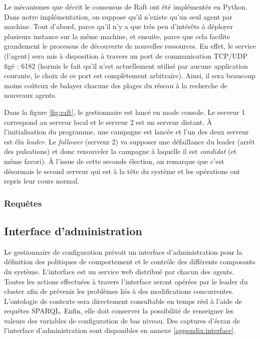 Le mécanismes que décrit le consensus de Raft ont été implémentés en Python.
Dans notre implémentation, on suppose qu'il n'existe qu'un seul agent par
machine. Tout d'abord, parce qu'il n'y a que très peu d'intérêts à déployer
plusieurs instance sur la même machine, et ensuite, parce que cela facilite
grandement le processus de découverte de nouvelles ressources. En effet, le
service (l'agent) sera mis à disposition à travers un port de communication
TCP/UDP figé : 6182 (hormis le fait qu'il n'est actuellement utilisé par aucune
application courante, le choix de ce port est complètement arbitraire). Ainsi,
il sera beaucoup moins coûteux de balayer chacune des plages du réseau à la
recherche de nouveaux agents.

Dans la figure \ref{fig:raft}, le gestionnaire est lancé en mode console. Le
serveur 1 correspond au serveur local et le serveur 2 est un serveur distant. À
l'initialisation du programme, une campagne est lancée et l'un des deux serveur
est élu \emph{leader}. Le \emph{follower} (serveur 2) va supposer une
défaillance du leader (arrêt des pulsations) et donc renouveler la campagne à
laquelle il est \emph{candidat} (et même favori). À l'issue de cette seconde
élection, on remarque que c'est désormais le second serveur qui est à la tête du
système et les opérations ont repris leur cours normal.

\subsubsection{Requêtes}


\subsection{Interface d'administration}

Le gestionnaire de configuration prévoit un interface d'administration
pour la définition des politiques de comportement et le contrôle des différents
composants du système. L'interface est un service web distribué par
chacun des agents. Toutes les actions effectuées à travers l'interface seront
opérées par le leader du cluster afin de prévenir les problèmes liés à des
modifications concurrentes. L'ontologie de contexte sera directement
consultable en temps réel à l'aide de requêtes SPARQL. Enfin, elle doit
conserver la possibilité de renseigner les valeurs des variables de
configuration de bas niveau. Des captures d'écran de l'interface
d'administration sont disponibles en annexe \ref{appendix:interface}.

